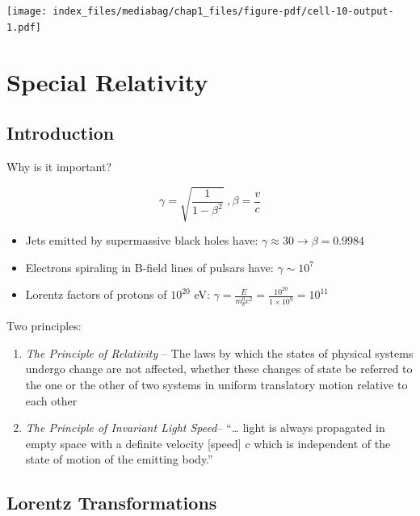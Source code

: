 \documentclass[
  letterpaper,
  DIV=11,
  numbers=noendperiod]{scrreprt}
\providecommand{\tightlist}{%
  \setlength{\itemsep}{0pt}\setlength{\parskip}{0pt}}\usepackage{longtable,booktabs,array}
\begin{document}
\texttt{[image: index\_files/mediabag/chap1\_files/figure-pdf/cell-10-output-1.pdf]}

\section*{Special Relativity}\label{special-relativity}


\subsection*{Introduction}\label{introduction}

Why is it important?

\[\gamma = \sqrt{\frac{1}{1-\beta^2}}\;, \beta = \frac{v}{c}\]

\begin{itemize}
\tightlist
\item
  Jets emitted by supermassive black holes have:
  \(\gamma \approx 30 \rightarrow \beta = 0.9984\)
\item
  Electrons spiraling in B-field lines of pulsars have:
  \(\gamma \sim 10^7\)
\item
  Lorentz factors of protons of \(10^{20}\) eV:
  \(\gamma = \frac{E}{m^0_p c^2} = \frac{10^{20}}{1\times 10^9} = 10^{11}\)
\end{itemize}

Two principles:

\begin{enumerate}
\def\labelenumi{\arabic{enumi}.}
\item
  \emph{The Principle of Relativity} -- The laws by which the states of
  physical systems undergo change are not affected, whether these
  changes of state be referred to the one or the other of two systems in
  uniform translatory motion relative to each other
\item
  \emph{The Principle of Invariant Light Speed}-- ``\ldots{} light is
  always propagated in empty space with a definite velocity {[}speed{]}
  c which is independent of the state of motion of the emitting body.''
\end{enumerate}

\subsection*{Lorentz Transformations}\label{lorentz-transformations}
\end{document}
